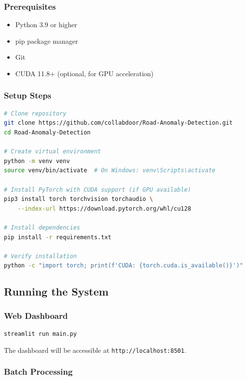 \documentclass[12pt]{article}
\begin{document}
\subsubsection*{Prerequisites}

\begin{itemize}
    \item Python 3.9 or higher
    \item pip package manager
    \item Git
    \item CUDA 11.8+ (optional, for GPU acceleration)
\end{itemize}

\subsubsection*{Setup Steps}

\begin{lstlisting}[language=bash, caption={Installation Commands}]
# Clone repository
git clone https://github.com/collabdoor/Road-Anomaly-Detection.git
cd Road-Anomaly-Detection

# Create virtual environment
python -m venv venv
source venv/bin/activate  # On Windows: venv\Scripts\activate

# Install PyTorch with CUDA support (if GPU available)
pip3 install torch torchvision torchaudio \
    --index-url https://download.pytorch.org/whl/cu128

# Install dependencies
pip install -r requirements.txt

# Verify installation
python -c "import torch; print(f'CUDA: {torch.cuda.is_available()}')"
\end{lstlisting}

\subsection{Running the System}

\subsubsection*{Web Dashboard}

\begin{lstlisting}[language=bash]
streamlit run main.py
\end{lstlisting}

The dashboard will be accessible at \texttt{http://localhost:8501}.

\subsubsection*{Batch Processing}
\end{document}
